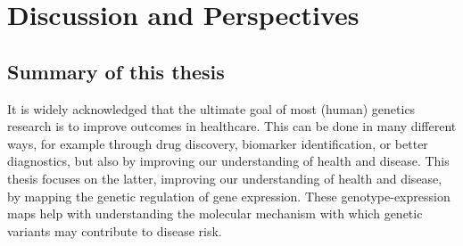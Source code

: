\chapter{Discussion and Perspectives}
\label{chap:discussion}

{ \Large {} }

\newpage

\section{Summary of this thesis}
It is widely acknowledged that the ultimate goal of most (human) genetics research is to improve outcomes in healthcare. This can be done in many different ways, for example through drug discovery, biomarker identification, or better diagnostics, but also by improving our understanding of health and disease\cite{mcguireRoadAheadGenetics2020, claussnitzerBriefHistoryHuman2020e}. This thesis focuses on the latter, improving our understanding of health and disease, by mapping the genetic regulation of gene expression. These genotype-expression maps help with understanding the molecular mechanism with which genetic variants may contribute to disease risk.  

